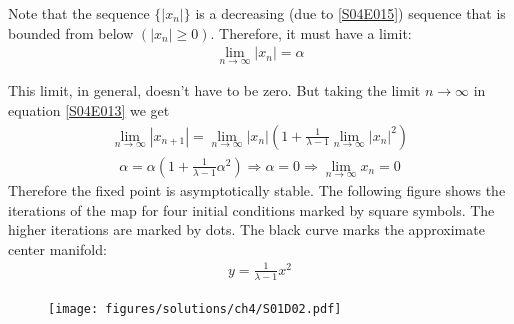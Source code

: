 \begin{solution}[4.1]
\begin{enumerate}
Note that the sequence $\{|x_n|\}$ is a decreasing (due to \eqref{S04E015}) sequence that is bounded from below $(|x_n| \geq 0)$. Therefore, it must have a limit:
\begin{align}
	\lim_{n \rightarrow \infty} |x_n| = \alpha
\end{align}

This limit, in general, doesn't have to be zero. But taking the limit $n \rightarrow \infty$ in equation \eqref{S04E013} we get
\begin{align}
	\lim_{n \rightarrow \infty} |x_{n+1}| = \lim_{n \rightarrow \infty}
	|x_n| \left( 1 + \frac{1}{\lambda - 1} \lim_{n \rightarrow \infty} |x_n|^2 \right)
\end{align}
\begin{align}
	\alpha = \alpha \left( 1 + \frac{1}{\lambda - 1} \alpha^2 \right) \Longrightarrow \alpha = 0 \Longrightarrow \lim_{n \rightarrow \infty} x_n = 0
\end{align}
Therefore the fixed point is asymptotically stable.
\vspace{15 pt}
The following figure shows the iterations of the map for four initial conditions marked by square symbols. The higher iterations are marked by dots. The black curve marks the approximate center manifold:
\begin{align}
	y = \frac{1}{\lambda - 1}x^2
\end{align}

\begin{figure}[h]
	\centering
	\texttt{[image: figures/solutions/ch4/S01D02.pdf]}
\end{figure}
\end{enumerate}
\end{solution}


